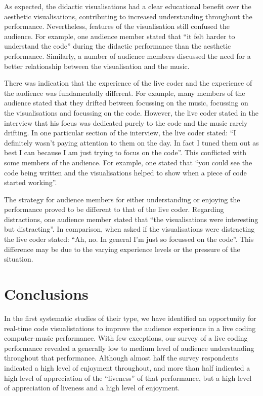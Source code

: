 \documentclass{sig-alternate}
\begin{document}
As expected, the didactic visualisations had a clear educational benefit over the aesthetic visualisations, contributing to increased understanding throughout the performance. Nevertheless, features of the visualisation still confused the audience. For example, one audience member stated that ``it felt harder to understand the code'' during the didactic performance than the aesthetic performance. Similarly, a number of audience members discussed the need for a better relationship between the visualisation and the music.

There was indication that the experience of the live coder and the experience of the audience was fundamentally different. For example, many members of the audience stated that they drifted between focussing on the music, focussing on the visualisations and focussing on the code. However, the live coder stated in the interview that his focus was dedicated purely to the code and the music rarely drifting. In one particular section of the interview, the live coder stated: ``I definitely wasn't paying attention to them on the day. In fact I tuned them out as best I can because I am just trying to focus on the code''. This conflicted with some members of the audience. For example, one stated that ``you could see the code being written and the visualisations helped to show when a piece of code started working''. 

The strategy for audience members for either understanding or enjoying the performance proved to be different to that of the live coder. Regarding distractions, one audience member stated that ``the visualisations were interesting but distracting''. In comparison, when asked if the visualisations were distracting the live coder stated: ``Ah, no. In general I'm just so focussed on the code''. This difference may be due to the varying experience levels or the pressure of the situation.

\section{Conclusions}
In the first systematic studies of their type, we have identified an opportunity for real-time code visualistations to improve the audience experience in a live coding computer-music performance. With few exceptions, our survey of a live coding performance revealed a generally low to medium level of audience understanding throughout that performance. Although almost half the survey respondents indicated a high level of enjoyment throughout, and more than half indicated a high level of appreciation of the ``liveness'' of that performance, but a high level of appreciation of liveness and a high level of enjoyment. 
\end{document}
